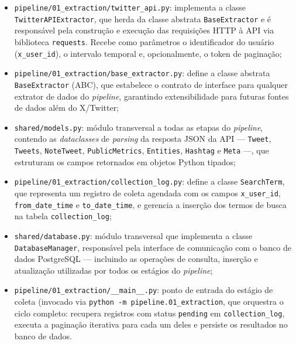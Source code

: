 \begin{itemize}
	\item \texttt{pipeline/01\_extraction/twitter\_api.py}: implementa a classe \texttt{TwitterAPIExtractor}, que herda da classe abstrata \texttt{BaseExtractor} e é responsável pela construção e execução
	das requisições HTTP à API via biblioteca \texttt{requests}. Recebe como parâmetros o identificador do usuário (\texttt{x\_user\_id}), o intervalo temporal e, opcionalmente, o token de paginação;
	
	\item \texttt{pipeline/01\_extraction/base\_extractor.py}: define a classe abstrata \texttt{BaseExtractor} (ABC), que estabelece o contrato de interface para qualquer extrator de dados do 	\textit{pipeline}, garantindo extensibilidade para futuras fontes de dados além do X/Twitter;
	
	\item \texttt{shared/models.py}: módulo transversal a todas as etapas do \textit{pipeline}, contendo as \textit{dataclasses} de \textit{parsing} da resposta JSON da API — \texttt{Tweet}, \texttt{Tweets}, \texttt{NoteTweet}, \texttt{PublicMetrics}, \texttt{Entities}, \texttt{Hashtag} e \texttt{Meta} —, que estruturam os campos retornados em objetos Python tipados;
	
	\item \texttt{pipeline/01\_extraction/collection\_log.py}: define a classe \texttt{SearchTerm}, que representa um registro de coleta agendada com os campos \texttt{x\_user\_id}, 	\texttt{from\_date\_time} e \texttt{to\_date\_time}, e gerencia a inserção dos termos de busca na tabela \texttt{collection\_log};
	
	\item \texttt{shared/database.py}: módulo transversal que implementa a classe \texttt{DatabaseManager}, responsável pela interface de comunicação com o banco de dados PostgreSQL — incluindo as operações de consulta, inserção e atualização utilizadas por todos os estágios do \textit{pipeline};
	
	\item \texttt{pipeline/01\_extraction/\_\_main\_\_.py}: ponto de entrada do estágio de coleta (invocado via \texttt{python -m pipeline.01\_extraction}, que orquestra o ciclo completo: recupera
	registros com status \texttt{pending} em \texttt{collection\_log}, executa a paginação iterativa para cada um deles e persiste os resultados no banco de dados.
\end{itemize}

